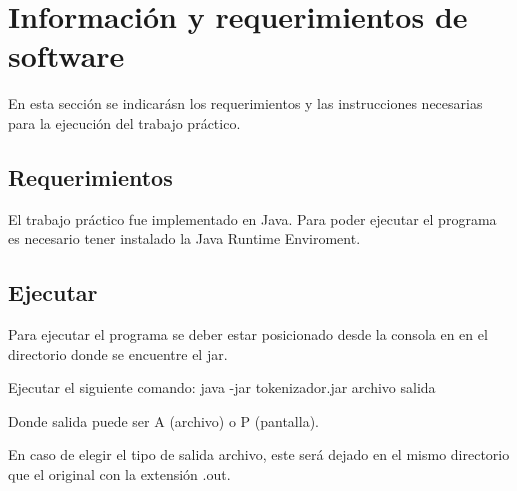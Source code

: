 \section{Informaci\'on y requerimientos de software}

En esta secci\'on se indicar\'asn los requerimientos y las instrucciones necesarias para la ejecuci\'on del trabajo pr\'actico.

\subsection{Requerimientos}

El trabajo pr\'actico fue implementado en Java. Para poder ejecutar el programa es necesario tener instalado la Java Runtime Enviroment. 


\subsection{Ejecutar}

Para ejecutar el programa se deber estar posicionado desde la consola en en el directorio donde se encuentre el jar.

Ejecutar el siguiente comando: java -jar tokenizador.jar archivo salida

Donde salida puede ser A (archivo) o P (pantalla). 

En caso de elegir el tipo de salida archivo, este ser\'a dejado en el mismo directorio que el original con la extensi\'on .out. 